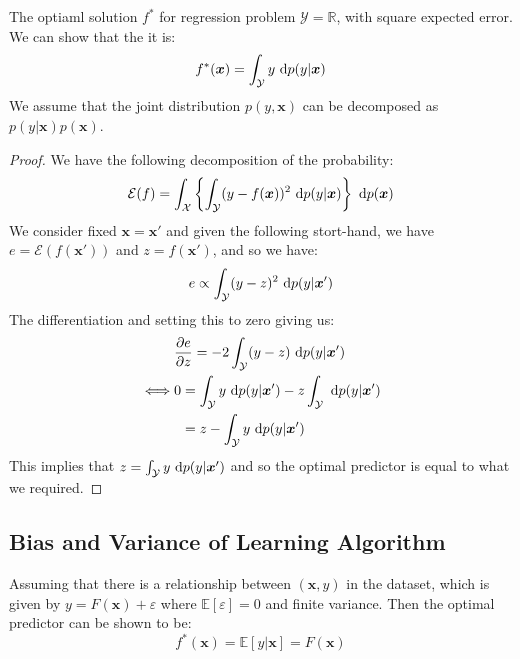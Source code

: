 \begin{proposition}
    The optiaml solution $f^*$ for regression problem $\mathcal{Y} = \mathbb{R}$, with square expected error. We can show that the it is:
    \begin{equation*}
        f^*(\boldsymbol x)  = \int_\mathcal{Y} y \ \mathrm{d} p(y|\boldsymbol x)
    \end{equation*}
    We assume that the joint distribution $p(y, \boldsymbol x)$ can be decomposed as $p(y | \boldsymbol x)p(\boldsymbol x)$.
\end{proposition}
\begin{proof}
    We have the following decomposition of the probability:
    \begin{equation*}
        \mathcal{E}(f) = \int_\mathcal{X} \left\{ \int_\mathcal{Y} (y - f(\boldsymbol x))^2 \ \mathrm{d} p(y|\boldsymbol x)  \right\}\ \mathrm{d} p(\boldsymbol x)
    \end{equation*}
    We consider fixed $\boldsymbol x = \boldsymbol x'$ and given the following stort-hand, we have $e = \mathcal{E}(f(\boldsymbol x'))$ and $z = f(\boldsymbol x')$, and so we have:
    \begin{equation*}
        e \propto \int_\mathcal{Y} (y-z)^2 \ \mathrm{d} p(y | \boldsymbol x')
    \end{equation*}
    The differentiation and setting this to zero giving us:
    \begin{equation*}
    \begin{aligned}
        &\frac{\partial e}{\partial z} = -2\int_{\mathcal{Y}}(y - z)\ \mathrm{d} p(y | \boldsymbol x') \\
        \iff& \begin{aligned}[t]
            0 &= \int_\mathcal{Y} y\ \mathrm{d} p(y | \boldsymbol x')  - z\int_\mathcal{Y} \ \mathrm{d} p(y | \boldsymbol x') \\
            &= z - \int_\mathcal{Y} y \ \mathrm{d} p(y | \boldsymbol x')
        \end{aligned}
    \end{aligned}
    \end{equation*}
    This implies that $z = \int_\mathcal{Y}y\ \mathrm{d} p(y | \boldsymbol x')$ and so the optimal predictor is equal to what we required.
\end{proof}

\subsection{Bias and Variance of Learning Algorithm}

\begin{remark}
    Assuming that there is a relationship between $(\boldsymbol x, y)$ in the dataset, which is given by $y = F(\boldsymbol x) + \varepsilon$ where $\mathbb{E}[\varepsilon] = 0$ and finite variance. Then the optimal predictor can be shown to be:
    \begin{equation*}
        f^*(\boldsymbol x) = \mathbb{E}[y | \boldsymbol x] = F(\boldsymbol x)
    \end{equation*}
\end{remark}

